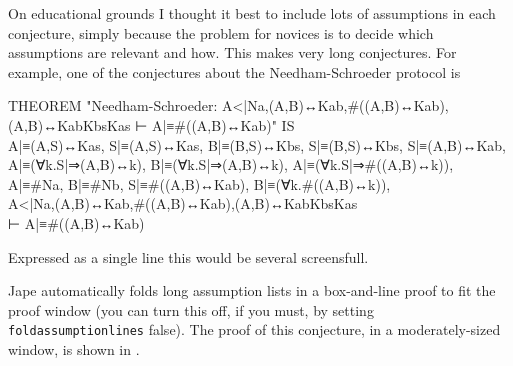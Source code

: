 On educational grounds I thought it best to include lots of assumptions in each conjecture, simply because the problem for novices is to decide which assumptions are relevant and how. This makes very long conjectures. For example, one of the conjectures about the Needham-Schroeder protocol is
\begin{japeish}
THEOREM "Needham-Schroeder: A<|{Na,(A,B)↔Kab,\#((A,B)↔Kab),{(A,B)↔Kab}Kbs}Kas ⊢ A|≡\#((A,B)↔Kab)" IS \\
\tab A|≡(A,S)↔Kas, S|≡(A,S)↔Kas, B|≡(B,S)↔Kbs, S|≡(B,S)↔Kbs, S|≡(A,B)↔Kab,\\
\tab A|≡(∀k.S|⇒(A,B)↔k), B|≡(∀k.S|⇒(A,B)↔k), A|≡(∀k.S|⇒\#((A,B)↔k)), \\
\tab A|≡\#Na, B|≡\#Nb, S|≡\#((A,B)↔Kab), B|≡(∀k.\#((A,B)↔k)), \\
\tab A<|{Na,(A,B)↔Kab,\#((A,B)↔Kab),{(A,B)↔Kab}Kbs}Kas \\
\tab ⊢ A|≡\#((A,B)↔Kab)
\end{japeish}
Expressed as a single line this would be several screensfull.

Jape automatically folds long assumption lists in a box-and-line proof to fit the proof window (you can turn this off, if you must, by setting \texttt{foldassumptionlines} false). The proof of this conjecture, in a moderately-sized window, is shown in .

 